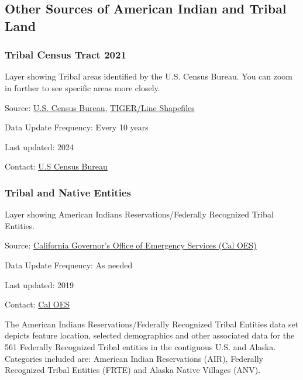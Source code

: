 \documentclass[
  letterpaper,
  DIV=11,
  numbers=noendperiod]{scrreprt}
\begin{document}
\subsection{Other Sources of American Indian and Tribal
Land}\label{other-sources-of-american-indian-and-tribal-land}

\subsubsection{Tribal Census Tract 2021}\label{tribal-census-tract-2021}

Layer showing Tribal areas identified by the U.S. Census Bureau. You can
zoom in further to see specific areas more closely.

Source:
\href{https://www.census.gov/cgi-bin/geo/shapefiles/index.php?year=2024&layergroup=American+Indian+Area+Geography}{U.S.
Census Bureau},
\href{https://www.census.gov/geographies/mapping-files/time-series/geo/tiger-line-file.html}{TIGER/Line
Shapefiles}

Data Update Frequency: Every 10 years

Last updated: 2024

Contact: \href{https://www.census.gov/about/contact-us.html}{U.S Census
Bureau}

\subsubsection{Tribal and Native
Entities}\label{tribal-and-native-entities}

Layer showing American Indians Reservations/Federally Recognized Tribal
Entities.

Source:
\href{https://calema.maps.arcgis.com/apps/mapviewer/index.html?layers=0b6c3f61f0c04168b2de56ac321ab76d}{California
Governor's Office of Emergency Services (Cal OES)}

Data Update Frequency: As needed

Last updated: 2019

Contact:
\href{https://www.caloes.ca.gov/office-of-the-director/policy-administration/tribal-coordination/}{Cal
OES}

The American Indians Reservations/Federally Recognized Tribal Entities
data set depicts feature location, selected demographics and other
associated data for the 561 Federally Recognized Tribal entities in the
contiguous U.S. and Alaska. Categories included are: American Indian
Reservations (AIR), Federally Recognized Tribal Entities (FRTE) and
Alaska Native Villages (ANV).
\end{document}
